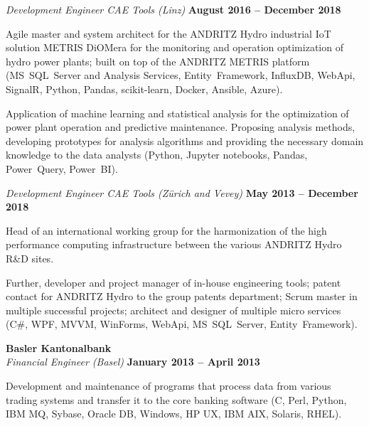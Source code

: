 \documentclass[line,11pt,a4paper]{resume}
\begin{document}
\begin{resume}
\textsl{Development Engineer CAE Tools (Linz)}
  \hfill \textbf{August 2016 -- December 2018}\\
\vspace{-4mm}%
\begin{list2}
  \item Agile master and system architect for the ANDRITZ Hydro industrial IoT
    solution METRIS DiOMera for the monitoring and operation optimization of
    hydro power plants; built on top of the ANDRITZ METRIS platform
    (MS~SQL~Server and Analysis Services, Entity~Framework, InfluxDB, WebApi,
    SignalR, Python, Pandas, scikit-learn, Docker, Ansible, Azure).
  \item Application of machine learning and statistical analysis for the
    optimization of power plant operation and predictive maintenance.
    Proposing analysis methods, developing prototypes for analysis algorithms
    and providing the necessary domain knowledge to the data analysts (Python,
    Jupyter notebooks, Pandas, Power~Query, Power~BI).
\end{list2}

\textsl{Development Engineer CAE Tools (Zürich and Vevey)}
  \hfill \textbf{May 2013 -- December 2018}\\
\vspace{-4mm}%
\begin{list2}
  \item Head of an international working group for the harmonization of the
    high performance computing infrastructure between the various ANDRITZ Hydro
    R\&D sites.

  \item Further, developer and project manager of in-house engineering tools;
    patent contact for ANDRITZ Hydro to the group patents department; Scrum
    master in multiple successful projects; architect and designer of multiple
    micro services (C\#, WPF, MVVM, WinForms, WebApi, MS~SQL~Server,
    Entity~Framework).
\end{list2}

\textbf{Basler Kantonalbank}\\\vspace{1mm}%
\textsl{Financial Engineer (Basel)}
  \hfill \textbf{January 2013 -- April 2013}\\
\vspace{-4mm}%
\begin{list2}
  \item Development and maintenance of programs that process data from various
    trading systems and transfer it to the core banking software (C, Perl,
    Python, IBM MQ, Sybase, Oracle DB, Windows, HP UX, IBM AIX, Solaris, RHEL).
\end{list2}


\end{resume}
\end{document}
